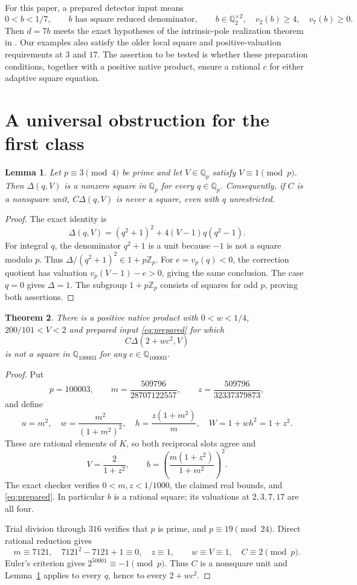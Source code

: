 \documentclass[11pt,a4paper]{article}
\newcommand{\Q}{\mathbb Q}\newcommand{\Z}{\mathbb Z}
\newtheorem{lemma}{Lemma}
\newtheorem{theorem}[lemma]{Theorem}
\begin{document}
For this paper, a prepared detector input means
\begin{equation}\label{eq:prepared}
 0<b<1/7,\qquad b\text{ has square reduced denominator},\qquad
 b\in\Q_2^{\times2},\quad v_2(b)\ge4,\quad v_7(b)\ge0.
\end{equation}
Then $d=7b$ meets the exact hypotheses of the intrinsic-pole
realization theorem in \cite{Intrinsic}. Our examples also satisfy
the older local square and positive-valuation requirements at
$3$ and $17$. The assertion to be tested is whether these
preparation conditions, together with a positive native product,
ensure a rational $c$ for either adaptive square equation.

\section{A universal obstruction for the first class}

\begin{lemma}\label{lem:firstlocal}
Let $p\equiv3\pmod4$ be prime and let $V\in\Q_p$ satisfy
$V\equiv1\pmod p$. Then $\Delta(q,V)$ is a nonzero square
in $\Q_p$ for every $q\in\Q_p$. Consequently, if $C$ is a
nonsquare unit, $C\Delta(q,V)$ is never a square, even with
$q$ unrestricted.
\end{lemma}
\begin{proof}
The exact identity is
\[
 \Delta(q,V)=(q^2+1)^2+4(V-1)q(q^2-1).
\]
For integral $q$, the denominator $q^2+1$ is a unit because
$-1$ is not a square modulo $p$. Thus
$\Delta/(q^2+1)^2\in1+p\Z_p$.
For $e=v_p(q)<0$, the correction quotient has valuation
$v_p(V-1)-e>0$, giving the same conclusion. The case $q=0$
gives $\Delta=1$. The subgroup $1+p\Z_p$ consists of squares
for odd $p$, proving both assertions.
\end{proof}

\begin{theorem}\label{thm:first}
There is a positive native product with
$0<w<1/4$, $200/101<V<2$ and prepared input \eqref{eq:prepared}
for which
\[
                      C\Delta(2+wc^2,V)
\]
is not a square in $\Q_{100003}$ for any $c\in\Q_{100003}$.
\end{theorem}
\begin{proof}
Put
\[
 p=100003,\qquad
 m=\frac{509796}{28707122557},\qquad
 z=\frac{509796}{32337379873},
\]
and define
\[
 u=m^2,\quad w=\frac{m^2}{(1+m^2)^2},\quad
 h=\frac{z(1+m^2)}m,\quad W=1+wh^2=1+z^2.
\]
These are rational elements of $K$, so both reciprocal slots
agree and
\[
 V=\frac2{1+z^2},\qquad
 b=\left(\frac{m(1+z^2)}{1+m^2}\right)^2.
\]
The exact checker verifies $0<m,z<1/1000$, the claimed real
bounds, and \eqref{eq:prepared}. In particular $b$ is a rational
square; its valuations at $2,3,7,17$ are all four.

Trial division through $316$ verifies that $p$ is prime, and
$p\equiv19\pmod{24}$. Direct rational reduction gives
\[
 m\equiv7121,\quad 7121^2-7121+1\equiv0,\quad z\equiv1,
 \qquad w\equiv V\equiv1,\quad C\equiv2\pmod p.
\]
Euler's criterion gives $2^{50001}\equiv-1\pmod p$.
Thus $C$ is a nonsquare unit and Lemma~\ref{lem:firstlocal}
applies to every $q$, hence to every $2+wc^2$.
\end{proof}
\end{document}

